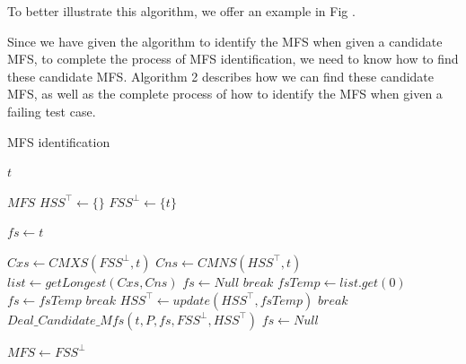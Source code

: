 \documentclass{sig-alternate-05-2015}
\begin{document}
{{To better illustrate this algorithm, we offer an example in Fig .



Since we have given the algorithm to identify the MFS when given a candidate MFS, to complete the process of MFS identification, we need to know how to find these candidate MFS. Algorithm 2 describes how we can find these candidate MFS, as well as the complete process of how to identify the MFS when given a failing test case.



\begin{algorithm}\label{al:identify}
  \caption{MFS identification}
  \begin{algorithmic}[1]
     \Require  $t$ 


     \Ensure  $MFS$ 
    \State $HSS^{\top} \leftarrow \{\}$
    \State $FSS^{\bot} \leftarrow \{ t \} $


    \State $fs \leftarrow t $

        \State $Cxs \leftarrow CMXS(FSS^{\bot}, t) $
        \State $Cns \leftarrow CMNS(HSS^{\top}, t) $
                \State $list \leftarrow getLongest(Cxs, Cns) $
                    \State $fs \leftarrow Null$
                    \State $break$
                \EndIf
                \State $fsTemp \leftarrow list.get(0)$
                    \State $fs \leftarrow fsTemp$
                    \State $break$
                \Else
                  \State $HSS^{\top} \leftarrow update(HSS^{\top}, fsTemp)$
                \EndIf
            \EndWhile
        \EndIf
            \State $break$
        \Else
        \State $Deal\_Candidate\_Mfs(t, P, fs, FSS^{\bot}, HSS^{\top})$
        \State $fs \leftarrow Null$
        \EndIf

    \EndWhile
     \State $MFS \leftarrow  FSS^{\bot}$
  \end{algorithmic}
\end{algorithm}

}}
\end{document}
